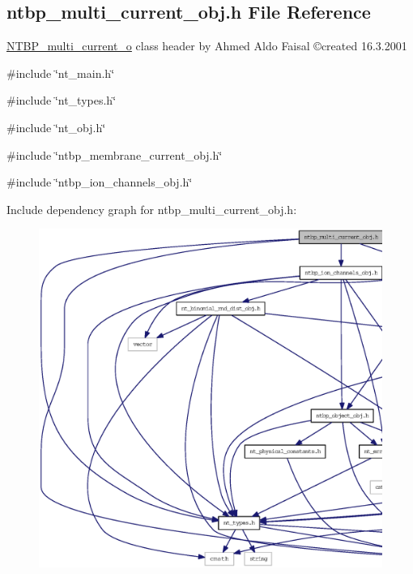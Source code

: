 \subsection{ntbp\_\-multi\_\-current\_\-obj.h File Reference}
\label{ntbp__multi__current__obj_8h}



\begin{DoxyItemize}
\item \hyperlink{class_n_t_b_p__multi__current__o}{NTBP\_\-multi\_\-current\_\-o} class header by Ahmed Aldo Faisal \copyright created 16.3.2001 
\end{DoxyItemize} 


{\ttfamily \#include \char`\"{}nt\_\-main.h\char`\"{}}\par
{\ttfamily \#include \char`\"{}nt\_\-types.h\char`\"{}}\par
{\ttfamily \#include \char`\"{}nt\_\-obj.h\char`\"{}}\par
{\ttfamily \#include \char`\"{}ntbp\_\-membrane\_\-current\_\-obj.h\char`\"{}}\par
{\ttfamily \#include \char`\"{}ntbp\_\-ion\_\-channels\_\-obj.h\char`\"{}}\par
Include dependency graph for ntbp\_\-multi\_\-current\_\-obj.h:
\nopagebreak
\begin{figure}[H]
\begin{center}
\leavevmode
\includegraphics[width=400pt]{ntbp__multi__current__obj_8h__incl}
\end{center}
\end{figure}
